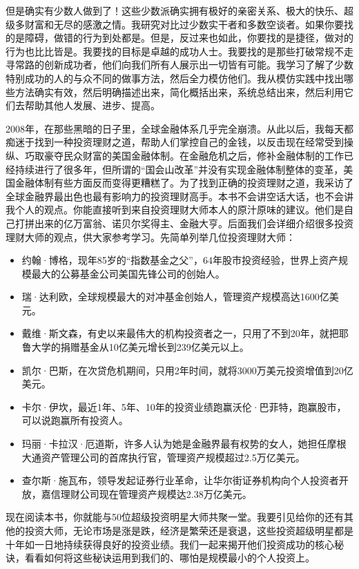 但是确实有少数人做到了！这些少数派确实拥有极好的亲密关系、极大的快乐、超级多财富和无尽的感激之情。我研究对比过少数实干者和多数空谈者。如果你要找的是障碍，做错的行为到处都是。但是，反过来也如此，你要找的是捷径，做对的行为也比比皆是。我要找的目标是卓越的成功人士。我要找的是那些打破常规不走寻常路的创新成功者，他们向我们所有人展示出一切皆有可能。我学习了解了少数特别成功的人的与众不同的做事方法，然后全力模仿他们。我从模仿实践中找出哪些方法确实有效，然后明确描述出来，简化概括出来，系统总结出来，然后利用它们去帮助其他人发展、进步、提高。

2008年，在那些黑暗的日子里，全球金融体系几乎完全崩溃。从此以后，我每天都痴迷于找到一种投资理财之道，帮助人们掌控自己的金钱，以反击现在经常受到操纵、巧取豪夺民众财富的美国金融体制。在金融危机之后，修补金融体制的工作已经持续进行了很多年，但所谓的“国会山改革”并没有实现金融体制整体的变革，美国金融体制有些方面反而变得更糟糕了。为了找到正确的投资理财之道，我采访了全球金融界最出色也最有影响力的投资理财高手。本书不会讲空话大话，也不会讲我个人的观点。你能直接听到来自投资理财大师本人的原汁原味的建议。他们是自己打拼出来的亿万富翁、诺贝尔奖得主、金融大亨。后面我们会详细介绍很多投资理财大师的观点，供大家参考学习。先简单列举几位投资理财大师：

\begin{itemize}
\item 约翰·博格，现年85岁的“指数基金之父”，64年股市投资经验，世界上资产规模最大的公募基金公司美国先锋公司的创始人。
\item 瑞·达利欧，全球规模最大的对冲基金创始人，管理资产规模高达1600亿美元。
\item 戴维·斯文森，有史以来最伟大的机构投资者之一，只用了不到20年，就把耶鲁大学的捐赠基金从10亿美元增长到239亿美元以上。
\item 凯尔·巴斯，在次贷危机期间，只用2年时间，就将3000万美元投资增值到20亿美元。
\item 卡尔·伊坎，最近1年、5年、10年的投资业绩跑赢沃伦·巴菲特，跑赢股市，可以说跑赢所有投资人。
\item 玛丽·卡拉汉·厄道斯，许多人认为她是金融界最有权势的女人，她担任摩根大通资产管理公司的首席执行官，管理资产规模超过2.5万亿美元。
\item 查尔斯·施瓦布，领导发起证券行业革命，让华尔街证券机构向个人投资者开放，嘉信理财公司现在管理资产规模达2.38万亿美元。
\end{itemize}

现在阅读本书，你就能与50位超级投资明星大师共聚一堂。我要引见给你的还有其他的投资大师，无论市场是涨是跌，经济是繁荣还是衰退，这些投资超级明星都是十年如一日地持续获得良好的投资业绩。我们一起来揭开他们投资成功的核心秘诀，看看如何将这些秘诀运用到我们的、哪怕是规模最小的个人投资上。

